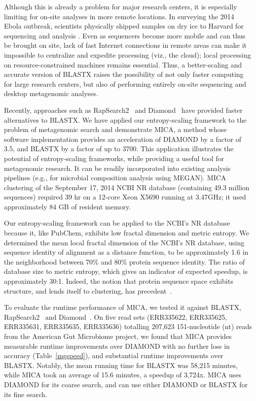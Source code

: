 \documentclass[11pt]{elsarticle}
\renewcommand{\cite}{\citep} %
\theoremstyle{definition}
\theoremstyle{remark}
\numberwithin{equation}{section}
\begin{document}
Although this is already a problem for major research centers, it is especially
limiting for on-site analyses in more remote locations.
In surveying the 2014 Ebola outbreak, scientists physically shipped samples on 
dry ice to Harvard for sequencing and analysis \cite{gire2014genomic}.
Even as sequencers become more mobile and can thus be brought on site, lack of fast Internet connections in remote
areas can make it impossible to centralize and expedite processing (viz., the cloud);
local processing on resource-constrained machines remains essential.
Thus, a better-scaling and accurate version of BLASTX raises the possibility of 
not only faster computing for large research centers, but also of performing
entirely on-site sequencing and desktop metagenomic analyses.

Recently, approaches such as RapSearch2~\cite{zhao2012rapsearch2} and 
Diamond~\cite{buchfink2014fast} have provided faster alternatives to BLASTX.
We have applied our entropy-scaling framework to the problem of 
metagenomic search and demonstrate MICA, a method whose software 
implementation provides an acceleration of DIAMOND by a factor of 3.5, and 
BLASTX by a factor of up to 3700.
This application illustrates the potential of entropy-scaling frameworks, while
providing a useful tool for metagenomic research.
It can be readily incorporated into existing analysis pipelines (e.g., for microbial 
composition analysis using MEGAN).
MICA clustering of the September 17, 2014 NCBI NR database (containing 49.3 million sequences) required 39 
hr on a 12-core Xeon X5690 running at 3.47GHz; it used approximately 84 GB of resident memory.

Our entropy-scaling framework can be applied to the NCBI's NR database because it, 
like PubChem, exhibits low fractal dimension and metric entropy.
We determined the mean local fractal dimension of the NCBI's NR database, using 
sequence identity of alignment as a distance function, to be approximately 1.6 
in the neighborhood between 70\% and 80\% protein sequence identity.
The ratio of database size to metric entropy, which gives an indicator of expected speedup,
is approximately 30:1.
Indeed, the notion that protein sequence space exhibits structure, 
and lends itself to clustering, has precedent~\cite{linial1997global}.

To evaluate the runtime performance of MICA, we tested it against
BLASTX, RapSearch2~\cite{zhao2012rapsearch2} and 
Diamond~\cite{buchfink2014fast}.
On five read sets (ERR335622, ERR335625, ERR335631, ERR335635, ERR335636) totalling 207,623 151-nucleotide (nt) reads from 
the American Gut Microbiome project, we found that MICA provides 
measurable runtime improvements over DIAMOND with no further loss in accuracy 
(Table~\ref{mgspeed}), and substantial runtime improvements over BLASTX.
Notably, the mean running time for BLASTX was 58,215 minutes, 
while MICA took an average of 15.6 minutes, a speedup of 3,724x.
MICA uses DIAMOND for its coarse search, and can use either DIAMOND or BLASTX
for its fine search.
\end{document}
